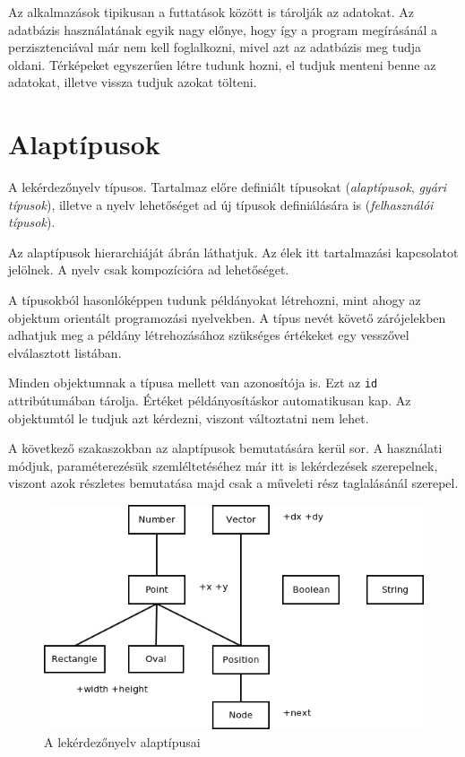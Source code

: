 Az alkalmazások tipikusan a futtatások között is tárolják az adatokat. Az adatbázis használatának egyik nagy előnye, hogy így a program megírásánál a perzisztenciával már nem kell foglalkozni, mivel azt az adatbázis meg tudja oldani. Térképeket egyszerűen létre tudunk hozni, el tudjuk menteni benne az adatokat, illetve vissza tudjuk azokat tölteni.

\section{Alaptípusok}

A lekérdezőnyelv típusos. Tartalmaz előre definiált típusokat (\textit{alaptípusok}, \textit{gyári típusok}), illetve a nyelv lehetőséget ad új típusok definiálására is (\textit{felhasználói típusok}).

Az alaptípusok hierarchiáját  ábrán láthatjuk. Az élek itt tartalmazási kapcsolatot jelölnek. A nyelv csak kompozícióra ad lehetőséget.

A típusokból hasonlóképpen tudunk példányokat létrehozni, mint ahogy az objektum orientált programozási nyelvekben. A típus nevét követő zárójelekben adhatjuk meg a példány létrehozásához szükséges értékeket egy vesszővel elválasztott listában.

Minden objektumnak a típusa mellett van azonosítója is. Ezt az \texttt{id} attribútumában tárolja. Értéket példányosításkor automatikusan kap. Az objektumtól le tudjuk azt kérdezni, viszont változtatni nem lehet.

A következő szakaszokban az alaptípusok bemutatására kerül sor. A használati módjuk, paraméterezésük szemléltetéséhez már itt is lekérdezések szerepelnek, viszont azok részletes bemutatása majd csak a műveleti rész taglalásánál szerepel.

\begin{figure}[htb]
\begin{center}
    \includegraphics[scale=0.7]{images/types}
    \caption{A lekérdezőnyelv alaptípusai}
    \label{fig:types}
\end{center}
\end{figure}

